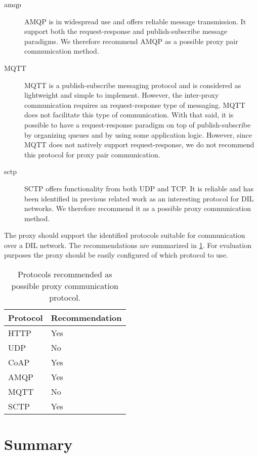 \begin{description}
	\item[\gls{amqp}] AMQP is in widespread use and offers reliable message
	transmission. It support both the request-response and publish-subscribe message paradigms.
	We therefore recommend AMQP as a possible proxy pair communication method.

	\item[MQTT] MQTT is a publish-subscribe messaging protocol and is considered
	as lightweight and simple to implement. However, the inter-proxy
	communication requires an request-response type of messaging. MQTT does not
	facilitate this type of communication. With that said, it is possible to
	have a request-response paradigm on top of publish-subscribe by organizing
	queues and by using some application logic. However, since MQTT does not
	natively support request-response, we do not recommend this protocol for
	proxy pair communication.

	\item[\gls{sctp}] SCTP offers functionality from both UDP and TCP. It is
	reliable and has been identified in previous related work as an interesting
	protocol for DIL networks. We therefore recommend it as a possible proxy
	communication method.

\end{description}

The proxy should support the identified protocols suitable for communication
over a DIL network. The recommendations are summarized in
\cref{table:possible-proxy-protocols}. For evaluation purposes the proxy should be
easily configured of which protocol to use.

\begin{table}[h]
\begin{tabularx}{\textwidth}{| X | X |}
\hline
  \textbf{Protocol} & \textbf{Recommendation} \\ \hline
  HTTP & Yes \\ \hline
  UDP & No \\ \hline
  CoAP & Yes \\ \hline
  AMQP & Yes \\ \hline
  MQTT & No \\ \hline
  SCTP & Yes \\ \hline
\end{tabularx}
\caption{Protocols recommended as possible proxy communication protocol.}
\label{table:possible-proxy-protocols}
\end{table}



\section{Summary}

